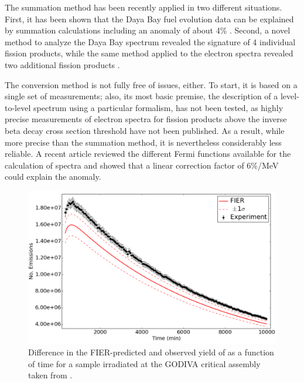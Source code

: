 \documentclass[letterpaper]{ar-1col}
\begin{document}
The summation method has been recently applied in two different situations.   First, it has been shown that the Daya Bay fuel evolution data \cite{An17} can be explained by summation calculations including an anomaly of about 4\% \cite{Hay18}.   Second, a novel method to analyze the Daya Bay spectrum revealed the signature of 4 individual fission products, while the same method applied to the electron spectra revealed two additional fission products \cite{Son18}.   

The conversion method is not fully free of issues, either.  To start, it is based on a single set of measurements; also, its most basic premise, the description of a level-to-level spectrum using a particular formalism, has not been tested, as highly precise measurements of electron spectra for fission products above the inverse beta decay cross section threshold have not been published.    As a result, while more precise than the summation method, it is nevertheless considerably less reliable.     A recent article \cite{Son17} reviewed the different Fermi functions available for the calculation of spectra and showed that a linear correction factor of 6\%/MeV could explain the anomaly.



\begin{figure}[b]
 \centering
 \includegraphics[width=0.7\linewidth]{667_before_alt.png}

 \caption{Difference in the FIER-predicted and observed yield of  as a function of time for a  sample irradiated at the GODIVA critical assembly taken from \cite{Matthews2018}.  }
 \label{fig:fier_plot}
\end{figure}
\end{document}
